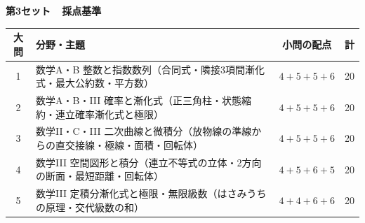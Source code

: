 \clearpage
{}

\noindent
{\Large\sffamily\bfseries 第3セット\ \ 採点基準}
\par\vspace{2mm}

\begin{center}
\small
\renewcommand{\arraystretch}{1.3}
\begin{tabular}{@{}clcc@{}}
\toprule
\textbf{大問} & \textbf{分野・主題} & \textbf{小問の配点} & \textbf{計} \\
\midrule
1 & 数学A・B 整数と指数数列（合同式・隣接3項間漸化式・最大公約数・平方数） & $4 + 5 + 5 + 6$ & 20 \\
2 & 数学A・B・III 確率と漸化式（正三角柱・状態縮約・連立確率漸化式と極限） & $4 + 5 + 5 + 6$ & 20 \\
3 & 数学II・C・III 二次曲線と微積分（放物線の準線からの直交接線・極線・面積・回転体） & $4 + 5 + 5 + 6$ & 20 \\
4 & 数学III 空間図形と積分（連立不等式の立体・2方向の断面・最短距離・回転体） & $4 + 5 + 6 + 5$ & 20 \\
5 & 数学III 定積分漸化式と極限・無限級数（はさみうちの原理・交代級数の和） & $4 + 4 + 6 + 6$ & 20 \\
\bottomrule
\end{tabular}
\end{center}

